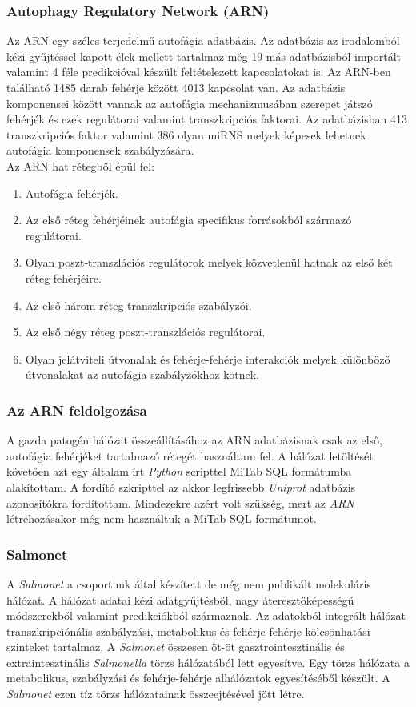 \documentclass[a4paper,12pt]{article}
\begin{document}
			\subsubsection{Autophagy Regulatory Network (ARN)}
			Az ARN egy széles terjedelmű autofágia adatbázis. Az adatbázis az irodalomból kézi gyűjtéssel kapott élek mellett tartalmaz még 19 más adatbázisból importált valamint 4 féle predikcióval készült feltételezett kapcsolatokat is. Az ARN-ben található 1485 darab fehérje között 4013 kapcsolat van. Az adatbázis komponensei között vannak az autofágia mechanizmusában szerepet játszó fehérjék és ezek regulátorai valamint transzkripciós faktorai. Az adatbázisban 413 transzkripciós faktor valamint 386 olyan miRNS melyek képesek lehetnek autofágia komponensek szabályzására.\cite{ARN} \\
			Az ARN hat rétegből épül fel:
			\begin{enumerate}
				\item Autofágia fehérjék.
				\item Az első réteg fehérjéinek autofágia specifikus forrásokból származó regulátorai.
				\item Olyan poszt-transzlációs regulátorok melyek közvetlenül hatnak az első két réteg fehérjéire.
				\item Az első három réteg transzkripciós szabályzói.
				\item Az első négy réteg poszt-transzlációs regulátorai.
				\item Olyan jelátviteli útvonalak és fehérje-fehérje interakciók melyek különböző útvonalakat az autofágia szabályzókhoz kötnek.
			\end{enumerate} \cite{ARN}
			
			\subsubsection{Az ARN feldolgozása}
			A gazda patogén hálózat összeállításához az ARN adatbázisnak csak az első, autofágia fehérjéket tartalmazó rétegét használtam fel. A hálózat letöltését követően azt egy általam írt \textit{Python} scripttel MiTab SQL formátumba alakítottam. A fordító szkripttel az akkor legfrissebb \textit{Uniprot} adatbázis azonosítókra fordítottam. Mindezekre azért volt szükség, mert az \textit{ARN} létrehozásakor még nem használtuk a MiTab SQL formátumot.
		
			\subsubsection{Salmonet} 
			A \textit{Salmonet} a csoportunk által készített de még nem publikált molekuláris hálózat. A hálózat adatai kézi adatgyűjtésből, nagy áteresztőképességű módszerekből valamint predikciókból származnak. Az adatokból integrált hálózat transzkripciónális szabályzási, metabolikus és fehérje-fehérje kölcsönhatási szinteket tartalmaz. A \textit{Salmonet} összesen öt-öt gasztrointesztinális és extraintesztinális \textit{Salmonella} törzs hálózatából lett egyesítve. Egy törzs hálózata a metabolikus, szabályzási és fehérje-fehérje alhálózatok egyesítéséből készült. A \textit{Salmonet} ezen tíz törzs hálózatainak összeejtésével jött létre.
			\cite{salmonet}
			
\end{document}

